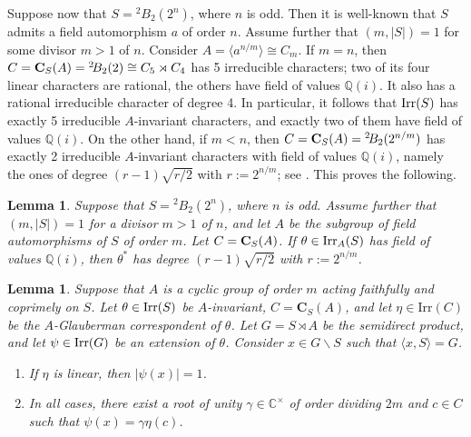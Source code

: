 \documentclass[11pt]{amsart}
\theoremstyle{plain}
\newtheorem{lem}[thm]{Lemma}
\theoremstyle{definition}
\numberwithin{thm}{section}
\numberwithin{equation}{thm}
\newcommand{\Irr}{\mathrm{Irr}}
\def\irr#1{{\rm Irr}(#1)}
\def\cent#1#2{{\bf C}_{#1}(#2)}
\newcommand{\C}{{\mathbb C}}
\newcommand{\Q}{{\mathbb Q}}
\newcommand{\0}{\emptyset}
\newcommand{\CB}{{\mathbf C}}
\newcommand{\tw}[1]{{}^#1\!}
\begin{document}
\medskip
Suppose now that $S=\tw2 B_2(2^n)$, where $n$ is odd. Then it is well-known that
$S$ admits a field automorphism $a$ of order $n$. Assume further that $(m, |S|)=1$ for some divisor $m > 1$ of $n$.
Consider $A=\langle a^{n/m} \rangle \cong C_m$. If $m = n$, 
 then $C=\cent SA=\tw2 B_2(2) \cong C_5 \rtimes C_4$ has 5 irreducible
characters; two of its four linear characters are rational, the others have 
field of values $\Q(i)$. 
It also has a rational irreducible character of degree 4. 
In particular, it follows that $\irr S$ has exactly 5 irreducible $A$-invariant characters, and exactly two 
of them have field of values $\Q(i)$. On the other hand, if $m < n$, 
 then $C=\cent SA=\tw2 B_2(2^{n/m})$ has exactly 2 irreducible $A$-invariant characters with field of values $\Q(i)$, namely
 the ones of degree $(r-1)\sqrt{r/2}$ with $r:=2^{n/m}$;
 see \cite{Bur}.
This proves the following.

\begin{lem}\label{coprime1}
Suppose that $S=\tw2 B_2(2^n)$, where $n$ is odd.
Assume further that $(m, |S|)=1$ for a divisor $m>1$ of $n$, and let $A$ be the subgroup of field automorphisms of $S$ of order $m$.
Let $C=\cent SA$. If $\theta \in {\rm Irr}_A(S)$ has field of values $\Q(i)$, then
$\theta^*$ has degree $(r-1)\sqrt{r/2}$ with $r:=2^{n/m}$.
\end{lem}

  
\begin{lem}\label{coprime2}
Suppose that $A$ is a cyclic group of order $m$  acting faithfully and coprimely on $S$.
Let $\theta \in \irr S$ be $A$-invariant, $C=\CB_S(A)$, and let $\eta \in \Irr(C)$ be the $A$-Glauberman correspondent of $\theta$. 
Let $G=S \rtimes A$ be the semidirect product,  and let $\psi \in \irr G$ be an extension of $\theta$. 
Consider $x \in G \smallsetminus S$ such that $\langle x,S \rangle = G$.
\begin{enumerate}[\rm(i)]
\item If $\eta$ is linear, then $|\psi(x)|=1$.
\item In all cases, there exist a root of unity $\gamma \in \C^\times$ of order dividing $2m$ and %
$c \in C$ such that $\psi(x)=\gamma \eta(c)$.
\end{enumerate}
\end{lem}
\end{document}
